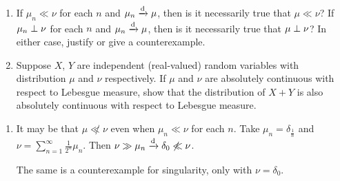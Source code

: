 \documentclass[12pt]{article}
\begin{document}
\begin{problem*} \leavevmode
    \begin{enumerate}
        \item If $\mu_n \ll \nu$ for each $n$ and $\mu_n \xrightarrow{\text{d}} \mu$, then is
        it necessarily true that $\mu \ll \nu$?
        If $\mu_n \perp \nu$ for each $n$ and $\mu_n \xrightarrow{\text{d}} \mu$, then is it
        necessarily true that $\mu \perp \nu$?
        In either case, justify or give a counterexample.
        \item Suppose $X$, $Y$ are independent (real-valued) random
        variables with distribution $\mu$ and $\nu$ respectively.
        If $\mu$ and $\nu$ are absolutely continuous with respect to
        Lebesgue measure, show that the distribution of $X + Y$ is also
        absolutely continuous with respect to Lebesgue measure.
    \end{enumerate}
\end{problem*}
\begin{solution} \leavevmode
    \begin{enumerate}
        \item It may be that $\mu \not\ll \nu$ even when $\mu_n \ll \nu$ for
        each $n$.
        Take $\mu_n = \delta_{\frac1n}$ and
        $\nu = \sum_{n=1}^\infty \frac1{2^n} \mu_n$.
        Then $\nu \gg \mu_n \xrightarrow{\text{d}} \delta_0 \not\ll \nu$.

        The same is a counterexample for singularity,
        only with $\nu = \delta_0$.
    \end{enumerate}
\end{solution}
\end{document}
